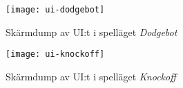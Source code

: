 \begin{figure}[t]
    \centering
    \texttt{[image: ui-dodgebot]}
    \caption{Skärmdump av UI:t i spelläget \textit{Dodgebot}}
    \label{fig:ui-dodgebot}
\end{figure}

\begin{figure}[b]
    \centering
    \texttt{[image: ui-knockoff]}
    \caption{Skärmdump av UI:t i spelläget \textit{Knockoff}}
    \label{fig:ui-knockoff}
\end{figure}

